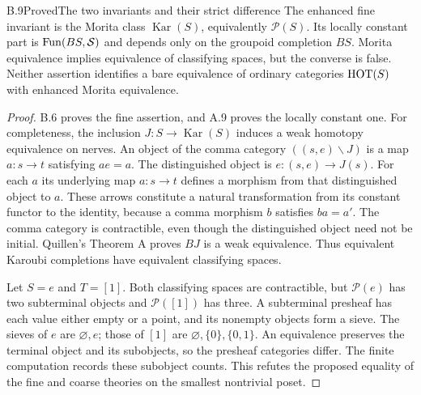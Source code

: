 \begin{statement}{B.9}{Proved}{The two invariants and their strict difference}
The enhanced fine invariant is the Morita class
$\operatorname{Kar}(S)$, equivalently $\mathcal P(S)$.
Its locally constant part is $\operatorname{Fun}(BS,\mathcal S)$ and depends only on the
groupoid completion $BS$. Morita equivalence implies equivalence of
classifying spaces, but the converse is false. Neither assertion
identifies a bare equivalence of ordinary categories $\mathrm{HOT}(S)$ with
enhanced Morita equivalence.
\end{statement}
\begin{proof}
B.6 proves the fine assertion, and A.9 proves the locally constant one.
For completeness, the inclusion $J:S\to\operatorname{Kar}(S)$ induces
a weak homotopy equivalence on nerves. An object of the comma category
$((s,e)\backslash J)$ is a map $a:s\to t$ satisfying $ae=a$. The
distinguished object is $e:(s,e)\to J(s)$. For each $a$ its underlying
map $a:s\to t$ defines a morphism from that distinguished object to
$a$. These arrows constitute a natural transformation from its constant
functor to the identity, because a comma morphism $b$ satisfies $ba=a'$.
The comma category is contractible, even though the distinguished object
need not be initial. Quillen's Theorem A proves $BJ$ is a weak
equivalence. Thus equivalent Karoubi completions have equivalent
classifying spaces.

Let $S=e$ and $T=[1]$. Both classifying spaces are contractible, but
$\mathcal P(e)$ has two subterminal objects and $\mathcal P([1])$ has
three. A subterminal presheaf has each value either empty or a point,
and its nonempty objects form a sieve. The sieves of $e$ are
$\varnothing,e$; those of $[1]$ are $\varnothing,\{0\},\{0,1\}$.
An equivalence preserves the terminal object and its subobjects, so the
presheaf categories differ. The finite computation records these
subobject counts. This refutes the proposed equality of the fine and
coarse theories on the smallest nontrivial poset.
\end{proof}

